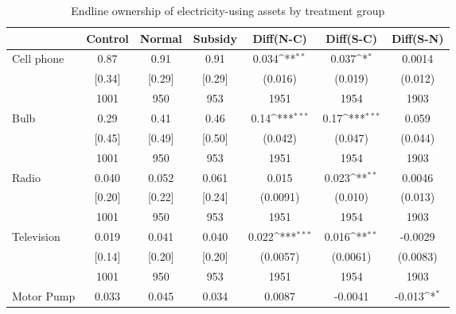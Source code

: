 \begin{table}[htbp]\centering
\def\sym#1{\ifmmode^{#1}\else\(^{#1}\)\fi}
\caption{Endline ownership of electricity-using assets by treatment group \label{tab:"balance"}}
\begin{tabular*}{1\hsize}{@{\hskip\tabcolsep\extracolsep\fill}l*{1}{cccccc}}
\toprule
                                &  Control&   Normal&  Subsidy&Diff(N-C)         &Diff(S-C)         &Diff(S-N)         \\
\midrule
Cell phone                      &     0.87&     0.91&     0.91&    0.034\sym{**} &    0.037\sym{*}  &   0.0014         \\
                                &   [0.34]&   [0.29]&   [0.29]&  (0.016)         &  (0.019)         &  (0.012)         \\
                                &     1001&      950&      953&     1951         &     1954         &     1903         \\
Bulb                            &     0.29&     0.41&     0.46&     0.14\sym{***}&     0.17\sym{***}&    0.059         \\
                                &   [0.45]&   [0.49]&   [0.50]&  (0.042)         &  (0.047)         &  (0.044)         \\
                                &     1001&      950&      953&     1951         &     1954         &     1903         \\
Radio                           &    0.040&    0.052&    0.061&    0.015         &    0.023\sym{**} &   0.0046         \\
                                &   [0.20]&   [0.22]&   [0.24]& (0.0091)         &  (0.010)         &  (0.013)         \\
                                &     1001&      950&      953&     1951         &     1954         &     1903         \\
Television                      &    0.019&    0.041&    0.040&    0.022\sym{***}&    0.016\sym{**} &  -0.0029         \\
                                &   [0.14]&   [0.20]&   [0.20]& (0.0057)         & (0.0061)         & (0.0083)         \\
                                &     1001&      950&      953&     1951         &     1954         &     1903         \\
Motor Pump                      &    0.033&    0.045&    0.034&   0.0087         &  -0.0041         &   -0.013\sym{*}  \\

\end{tabular*}
\end{table}
